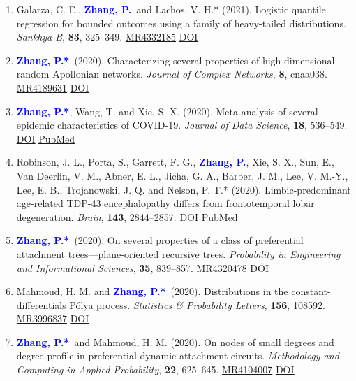 \documentclass{res}
\def\MR#1{\href{http://www.ams.org/mathscinet-getitem?mr=#1}{MR#1}}
\newcommand{\PZ}{\textbf{\textcolor{blue}{Zhang, P.*}}}
\newcommand{\PZnot}{\textbf{\textcolor{blue}{Zhang, P.}}}
\begin{document}
\begin{resume}
\begin{enumerate}
	\item {\sc Galarza, C. E.}, \PZnot\	and {\sc Lachos, V. H.*} 
	(2021). Logistic quantile regression for bounded outcomes using 
	a family of heavy-tailed distributions. {\em Sankhya B}, {\bf 
	83}, 325--349. \MR{4332185} 
	\href{https://doi.org/10.1007/s13571-020-00231-0}
	{\underline{DOI}}
	
	\item \PZ\ (2020). Characterizing several properties of 
	high-dimensional random Apollonian networks. {\em 
	Journal of Complex Networks}, {\bf 8}, cnaa038. \MR{4189631}
	\href{https://doi.org/10.1093/comnet/cnaa038}
	{\underline{DOI}}
	
	\item \PZ, {\sc Wang, T.} and {\sc Xie, S. X.} 
	(2020). Meta-analysis of several epidemic characteristics of 
	COVID-19. {\em Journal of Data Science}, {\bf 18}, 536--549. 
	\href{https://doi.org/10.6339/JDS.202007_18(3).0019}
	{\underline{DOI}}
	\href{https://pubmed.ncbi.nlm.nih.gov/33088292}
	{\underline{PubMed}}
	
	\item {\sc Robinson, J. L., Porta, S., Garrett, F. G.}, 
	\PZnot, {\sc Xie, S. X., Sun, E., 
	Van Deerlin, V. M., Abner, 
	E. L., Jicha, G. A., Barber, J. M., Lee, V. M.-Y., Lee, E. B., 
	Trojanowski, J. Q.} and {\sc Nelson, P. T.*} (2020). 
	Limbic-predominant age-related TDP-43 encephalopathy differs 
	from frontotemporal lobar degeneration. {\em Brain}, {\bf 143}, 
	2844--2857. 
	\href{https://doi.org/10.1093/brain/awaa219}
	{\underline{DOI}}
	\href{https://pubmed.ncbi.nlm.nih.gov/32830216}
	{\underline{PubMed}}
		
	\item \PZ\ (2020). On several properties of a 
	class of preferential attachment trees---plane-oriented 
	recursive trees. {\em Probability in Engineering and 
	Informational Sciences}, {\bf 35}, 839--857. \MR{4320478}
	\href{https://doi.org/10.1017/S0269964820000261}
	{\underline{DOI}}
	
	\item {\sc Mahmoud, H. M.} and \PZ\ (2020). 
	Distributions in the constant-differentials P\'{o}lya process. 
	{\em Statistics \& Probability Letters}, \textbf{156}, 108592. 
	\MR{3996837}
	\href{https://doi.org/10.1016/j.spl.2019.108592}
	{\underline{DOI}}
		
	\item \PZ\ and {\sc Mahmoud, H. M.} (2020). On 
	nodes of small degrees and degree profile in preferential 
	dynamic attachment circuits. {\em Methodology and Computing in 
	Applied Probability}, \textbf{22}, 625--645. \MR{4104007}
	\href{https://doi.org/10.1007/s11009-019-09726-4}
	{\underline{DOI}}


\end{enumerate}
\end{resume}
\end{document}
